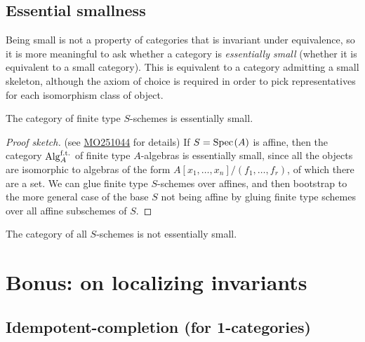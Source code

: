 \subsection{Essential smallness}

Being small is not a property of categories that is invariant under equivalence, so it is more meaningful to ask whether a category is \textit{essentially small} (whether it is equivalent to a small category). This is equivalent to a category admitting a small skeleton, although the axiom of choice is required in order to pick representatives for each isomorphism class of object.

\begin{theorem}\label{thm:finite-type-schemes-essentially-small} 
The category of finite type $S$-schemes is essentially small.
\end{theorem}
\begin{proof}[Proof sketch] (see \href{https://mathoverflow.net/a/251044}{MO251044} for details) If $S = \text{Spec}\hspace{0.1em}(A)$ is affine, then the category $\mathrm{Alg}_A^{\text{f.t.}}$ of finite type $A$-algebras is essentially small, since all the objects are isomorphic to algebras of the form $A[x_1, \ldots, x_n]/(f_1, \ldots, f_r)$, of which there are a set. We can glue finite type $S$-schemes over affines, and then bootstrap to the more general case of the base $S$ not being affine by gluing finite type schemes over all affine subschemes of $S$.
\end{proof}

\begin{remark} The category of all $S$-schemes is not essentially small.
\end{remark}

\section{Bonus: on localizing invariants}



\subsection{Idempotent-completion (for 1-categories)}

